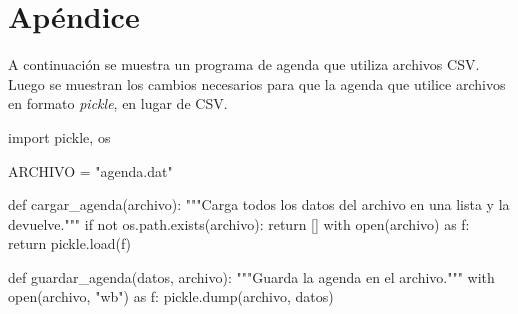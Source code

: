 \newpage
\section{Apéndice}

A continuación se muestra un programa de agenda que utiliza archivos
CSV. Luego se muestran los cambios necesarios para que la agenda que utilice archivos
en formato {\it pickle}, en lugar de CSV.



\begin{codigo-python}
import pickle, os

ARCHIVO = "agenda.dat"

def cargar_agenda(archivo):
    """Carga todos los datos del archivo en una lista y la devuelve."""
    if not os.path.exists(archivo):
        return []
    with open(archivo) as f:
        return pickle.load(f)

def guardar_agenda(datos, archivo):
    """Guarda la agenda en el archivo."""
    with open(archivo, "wb") as f:
        pickle.dump(archivo, datos)
\end{codigo-python}

